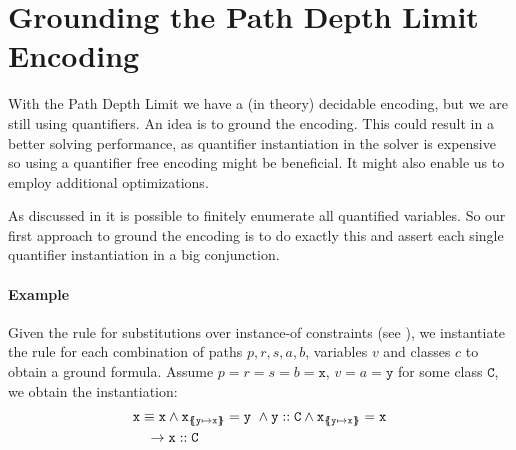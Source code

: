 \documentclass[a4paper]{article}
\begin{document}
\section{Grounding the Path Depth Limit Encoding}
With the Path Depth Limit we have a (in theory) decidable encoding,
but we are still using quantifiers.
An idea is to ground the encoding.
This could result in a better solving performance, as quantifier instantiation
in the solver is expensive
so using a quantifier free encoding might be beneficial.
It might also enable us to employ additional optimizations.

As discussed in  it is possible
to finitely enumerate all quantified variables.
So our first approach to ground the encoding is to do exactly this
and assert each single quantifier instantiation in a big conjunction.

\paragraph{Example}
\label{ex:smt-ground-instantiation}
Given the rule for substitutions over instance-of constraints (see ),
we instantiate the rule for each combination of paths $p,r,s,a,b$,
variables $v$ and classes $c$ to obtain a ground formula.
Assume $p=r=s=b=\mathtt{x}$, $v=a=\mathtt{y}$ for some class $\mathtt{C}$,
we obtain the instantiation:
%
\begin{align*}
  &\mathit{\mathtt{x}} \equiv \mathit{\mathtt{x}} \land \mathtt{x}_{\{\mskip-6.9mu\{ \mathtt{y} \mapsto \mathtt{x} \}\mskip-6.9mu\}}=\mathtt{y}~\land
  \mathit{\mathtt{y}} :: \mathit{\mathtt{C}} \land \mathtt{x}_{\{\mskip-6.9mu\{ \mathtt{y} \mapsto \mathtt{x} \}\mskip-6.9mu\}}=\mathtt{x}\\
  &\quad \rightarrow \mathit{\mathtt{x}} :: \mathit{\mathtt{C}}
\end{align*}
\end{document}
